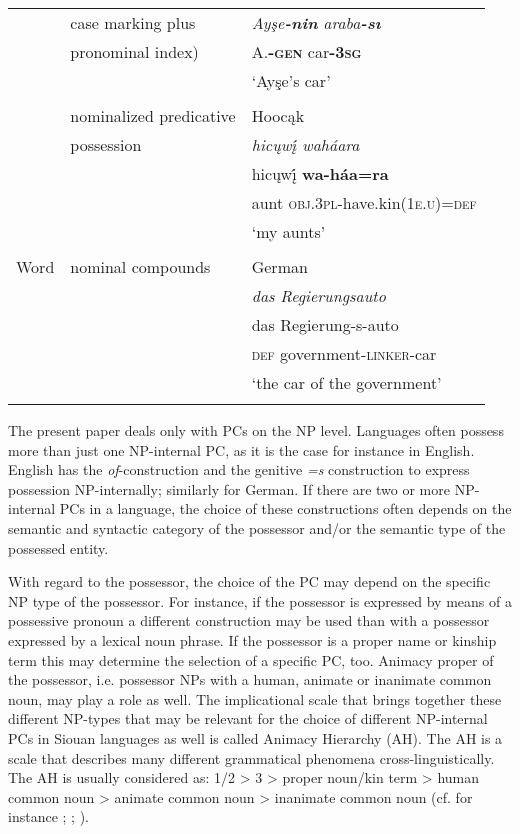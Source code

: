 \documentclass[output=paper]{LSP/langsci}
\begin{document}
\begin{table}
\begin{tabularx}{\textwidth}{l l X }
& case marking plus &\textit{Ayşe\textbf{-nin} araba\textbf{-sı}} \\
& pronominal index) & 	A.\textbf{-\textsc{gen}}    car\textbf{-\textsc{3sg}} \\
& & `Ayşe's car' \\
& \\
& nominalized predicative  & Hooc\k{a}k \citep[19]{Helmbrecht2003} \\
& possession & \textit{hicųwį́ waháara} \\
& & hicųwį́  \textbf{wa-háa=ra} \\
& & aunt      \textsc{obj.3pl}-have.kin(\textsc{1e.u})=\textsc{def} \\
& & `my aunts' \\
& \\
Word & nominal compounds & German \\
& & \textit{das Regierungsauto} \\
& & das Regierung-s-auto \\
& & \textsc{def} government-\textsc{linker}-car \\
& & `the car of the government' \\
\lspbottomrule
\end{tabularx}
\end{table}

The present paper deals only with PCs on the NP level. Languages often possess more than just one NP-internal PC, as it is the case for instance in English. English has the \textit{of}-construction and the genitive \textit{=s} construction to express possession NP-internally; similarly for German. If there are two or more NP-internal PCs in a language, the choice of these constructions often depends on the semantic and syntactic category of the possessor and/or the semantic type of the possessed entity. 

With regard to the possessor, the choice of the PC may depend on the specific NP type of the possessor. For instance, if the possessor is expressed by means of a possessive pronoun a different construction may be used than with a possessor expressed by a lexical noun phrase. If the possessor is a proper name or kinship term this may determine the selection of a specific PC, too. Animacy proper of the possessor, i.e. possessor NPs with a human, animate or inanimate common noun, may play a role as well. The implicational scale that brings together these different NP-types that may be relevant for the choice of different NP-internal PCs in Siouan languages as well is called Animacy Hierarchy (AH). The AH is a scale that describes many different grammatical phenomena cross-linguistically. The AH is usually considered as: 1/2 > 3 > proper noun/kin term > human common noun > animate common noun > inanimate common noun (cf. for instance \citealt{Dixon1979}; \citealt{Comrie1981}; \citealt{Croft2003}).
\end{document}
